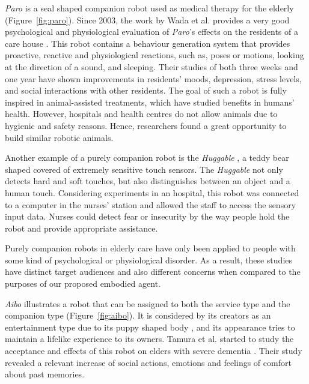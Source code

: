\emph{Paro} is a seal shaped companion robot used as medical therapy for the elderly (Figure~\ref{fig:paro}).
Since 2003, the work by Wada et al. provides a very good psychological and physiological evaluation of \emph{Paro}'s effects on the residents of a care house \cite{Wada2003,Wada2005,Wada2007}.
This robot contains a behaviour generation system that provides proactive, reactive and physiological reactions, such as, poses or motions, looking at the direction of a sound, and sleeping.
Their studies of both three weeks and one year have shown improvements in residents' moods, depression, stress levels, and social interactions with other residents.
The goal of such a robot is fully inspired in animal-assisted treatments, which have studied benefits in humans' health.
However, hospitals and health centres do not allow animals due to hygienic and safety reasons.
Hence, researchers found a great opportunity to build similar robotic animals.

Another example of a purely companion robot is the \emph{Huggable} \cite{Stiehl2005}, a teddy bear shaped covered of extremely sensitive touch sensors.
The \emph{Huggable} not only detects hard and soft touches, but also distinguishes between an object and a human touch.
Considering experiments in an hospital, this robot was connected to a computer in the nurses' station and allowed the staff to access the sensory input data.
Nurses could detect fear or insecurity by the way people hold the robot and provide appropriate assistance.

Purely companion robots in elderly care have only been applied to people with some kind of psychological or physiological disorder.
As a result, these studies have distinct target audiences and also different concerns when compared to the purposes of our proposed embodied agent.


\emph{Aibo} illustrates a robot that can be assigned to both the service type and the companion type (Figure~\ref{fig:aibo}).
It is considered by its creators as an entertainment type due to its puppy shaped body \cite{Fujita1983}, and its appearance tries to maintain a lifelike experience to its owners.
Tamura et al. started to study the acceptance and effects of this robot on elders with severe dementia \cite{Tamura2004}.
Their study revealed a relevant increase of social actions, emotions and feelings of comfort about past memories.


